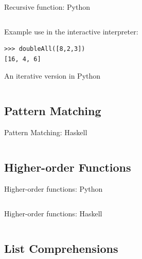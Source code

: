 \documentclass{beamer}
\begin{document}
\begin{frame}[fragile]{Recursive function: Python}

  \inputminted[firstline=3]{python}{code/doubleall_recursion.py}

  \vskip5mm

Example use in the interactive interpreter:

  \begin{verbatim}
>>> doubleAll([8,2,3])
[16, 4, 6]
  \end{verbatim}

\end{frame}

\begin{frame}{An iterative version in Python}

  \inputminted[firstline=3]{python}{code/doubleall_iterative.py}

\end{frame}

\subsection{Pattern Matching}

\begin{frame}{Pattern Matching: Haskell}

  \inputminted[lastline=3]{haskell}{code/doubleall_recursion.hs}

\end{frame}

\subsection{Higher-order Functions}

\begin{frame}{Higher-order functions: Python}

  \inputminted[firstline=3,lastline=10]{python}{code/higher_order.py}

\end{frame}

\begin{frame}{Higher-order functions: Haskell}

  \inputminted[lastline=5]{haskell}{code/higher_order.hs}

\end{frame}


\subsection{List Comprehensions}
\end{document}
